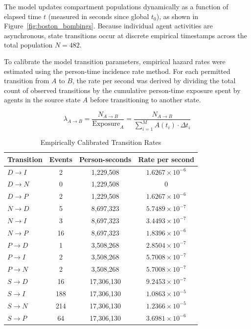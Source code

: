 \documentclass[11pt]{article}
\begin{document}
The model updates compartment populations dynamically as a function of elapsed time
$t$ (measured in seconds since global $t_0$), as shown in Figure~\ref{fig:boston_bombings}.
Because individual agent activities are asynchronous, state transitions occur at
discrete empirical timestamps across the total population $N = 482$.

To calibrate the model transition parameters, empirical hazard rates were estimated
using the person-time incidence rate method. For each permitted transition from $A$ to
$B$, the rate per second was derived by dividing the total count of observed
transitions by the cumulative person-time exposure spent by agents in the source state
$A$ before transitioning to another state.

\begin{equation*}
\lambda_{A \to B} = \frac{N_{A \to B}}{\text{Exposure}_A}
= \frac{N_{A \to B}}{\sum_{i=1}^{M} A(t_i) \cdot \Delta t_i}
\end{equation*}

\begin{table}[htbp]
\centering
\caption{Empirically Calibrated Transition Rates}
\label{tab:calibrated_rates}
\begin{tabular}{lccc}
\toprule
\textbf{Transition} & \textbf{Events} & \textbf{Person-seconds} & \textbf{Rate per second} \\
\midrule
$D \to I$ & 2   & 1{,}229{,}508 & $1.6267 \times 10^{-6}$ \\
$D \to N$ & 0   & 1{,}229{,}508 & $0$ \\
$D \to P$ & 2   & 1{,}229{,}508 & $1.6267 \times 10^{-6}$ \\
$N \to D$ & 5   & 8{,}697{,}323 & $5.7489 \times 10^{-7}$ \\
$N \to I$ & 3   & 8{,}697{,}323 & $3.4493 \times 10^{-7}$ \\
$N \to P$ & 16  & 8{,}697{,}323 & $1.8396 \times 10^{-6}$ \\
$P \to D$ & 1   & 3{,}508{,}268 & $2.8504 \times 10^{-7}$ \\
$P \to I$ & 2   & 3{,}508{,}268 & $5.7008 \times 10^{-7}$ \\
$P \to N$ & 2   & 3{,}508{,}268 & $5.7008 \times 10^{-7}$ \\
$S \to D$ & 16  & 17{,}306{,}130 & $9.2453 \times 10^{-7}$ \\
$S \to I$ & 188 & 17{,}306{,}130 & $1.0863 \times 10^{-5}$ \\
$S \to N$ & 214 & 17{,}306{,}130 & $1.2366 \times 10^{-5}$ \\
$S \to P$ & 64  & 17{,}306{,}130 & $3.6981 \times 10^{-6}$ \\
\bottomrule
\end{tabular}
\end{table}
\end{document}
